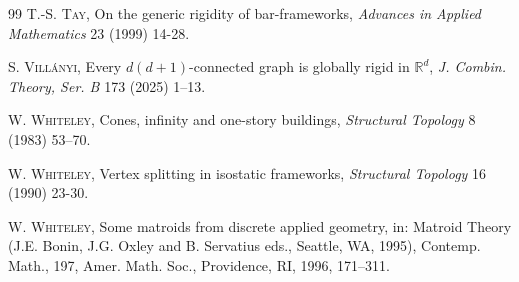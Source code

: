 \documentclass[11pt,a4paper]{article}
\theoremstyle{definition}
\begin{document}
\begin{thebibliography}{99}
     {\scshape T.-S. Tay},
    On the generic rigidity of bar-frameworks,
    {\it Advances in Applied Mathematics} 23 (1999) 14-28.
    
    
    
     {\scshape S. Vill\'anyi}, Every $d(d+1)$-connected graph is globally rigid in $\mathbb{R}^d$, {\it J.
        Combin. Theory, Ser. B} 173 (2025)  1–13.
    
    
    
      {\scshape W. Whiteley},
    {Cones, infinity and one-story buildings}, \emph{Structural Topology} 8 (1983) 53--70.
    
     {\scshape W. Whiteley}, Vertex splitting in isostatic frameworks, {\it Structural Topology} 16 (1990) 23-30.

     {\scshape
        W. Whiteley},
    \newblock Some matroids from discrete applied geometry, 
    in:
    \newblock Matroid Theory (J.E. Bonin, J.G. Oxley and B. Servatius eds.,
    Seattle, WA, 1995),
    Contemp. Math., 197, Amer. Math. Soc., Providence, RI,  1996, 171--311.
    \end{thebibliography}
\end{document}
